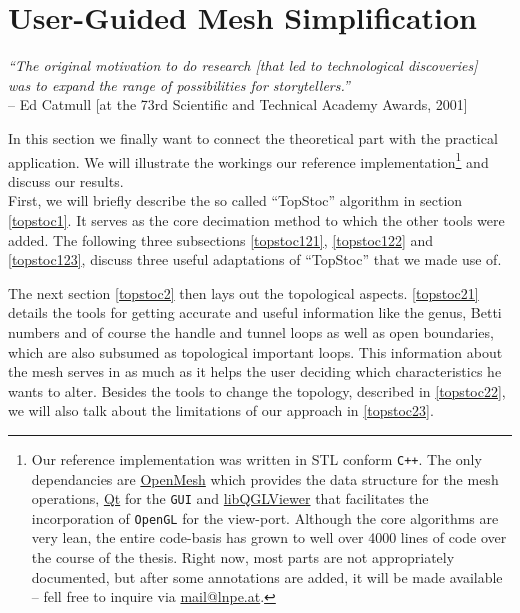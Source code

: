 \chapter{User-Guided Mesh Simplification}
\label{topstoc0}

\begin{flushright}
\textit{``The original motivation to do research [that led to technological discoveries]\\was to expand the range of possibilities for storytellers.''}\\
-- Ed Catmull {[}at the 73rd Scientific and Technical Academy Awards, 2001{]}
\end{flushright}

In this section we finally want to connect the theoretical part with the practical application.
We will illustrate the workings our reference implementation\footnote{ Our reference implementation was written in STL conform \texttt{C++}. The only dependancies are \href{http://www.openmesh.org/}{OpenMesh} which provides the data structure for the mesh operations, \href{http://www.qtcentre.org/content/}{Qt} for the \texttt{GUI} and \href{http://www.libqglviewer.com/}{libQGLViewer} that facilitates the incorporation of \texttt{OpenGL} for the view-port. Although the core algorithms are very lean, the entire code-basis has grown to well over 4000 lines of code over the course of the thesis.
Right now, most parts are not appropriately documented, but after some annotations are added, it will be made available -- fell free to inquire via \href{mailto:mail@lnpe.at}{mail@lnpe.at}.} and discuss our results.\\
First, we will briefly describe the so called ``TopStoc'' algorithm in section \ref{topstoc1}.
It serves as the core decimation method to which the other tools were added.
The following three subsections \ref{topstoc121}, \ref{topstoc122} and \ref{topstoc123}, discuss three useful adaptations of ``TopStoc'' that we made use of.

The next section \ref{topstoc2} then lays out the topological aspects.
\ref{topstoc21} details the tools for getting accurate and useful information like the genus, Betti numbers and of course the handle and tunnel loops as well as open boundaries, which are also subsumed as topological important loops.
This information about the mesh serves in as much as it helps the user deciding which characteristics he wants to alter.  
Besides the tools to change the topology, described in \ref{topstoc22}, we will also talk about the limitations of our approach in \ref{topstoc23}.

